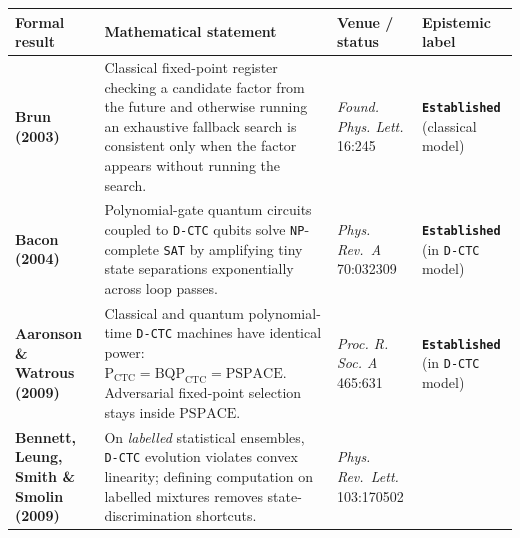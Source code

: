 \documentclass[10pt,letterpaper]{article}
\newcounter{none}
\begin{document}
{\def\LTcaptype{none} %
{\footnotesize\setlength{\tabcolsep}{3.8pt}\renewcommand{\arraystretch}{1.15}
\begin{longtable}[]{@{}
  >{\raggedright\arraybackslash}p{}
  >{\raggedright\arraybackslash}p{}
  >{\raggedright\arraybackslash}p{}
  >{\raggedright\arraybackslash}p{}@{}}
\toprule\noalign{}
\begin{minipage}[b]{\linewidth}\raggedright
\textbf{Formal result}
\end{minipage} & \begin{minipage}[b]{\linewidth}\raggedright
\textbf{Mathematical statement}
\end{minipage} & \begin{minipage}[b]{\linewidth}\raggedright
\textbf{Venue / status}
\end{minipage} & \begin{minipage}[b]{\linewidth}\raggedright
\textbf{Epistemic label}
\end{minipage} \\
\midrule\noalign{}
\endhead
\bottomrule\noalign{}
\endlastfoot
\textbf{Brun (2003)} & Classical fixed-point register checking a
candidate factor from the future and otherwise running an exhaustive
fallback search is consistent only when the factor appears without
running the search. & \emph{Found. Phys. Lett.} 16:245 &
\textbf{\texttt{Established}} (classical model) \\
\textbf{Bacon (2004)} & Polynomial-gate quantum circuits coupled to
\texttt{D-CTC} qubits solve \texttt{NP}-complete \texttt{SAT} by
amplifying tiny state separations exponentially across loop passes. &
\emph{Phys. Rev.~A} 70:032309 & \textbf{\texttt{Established}} (in
\texttt{D-CTC} model) \\
\textbf{Aaronson \& Watrous (2009)} & Classical and quantum
polynomial-time \texttt{D-CTC} machines have identical power:
\(\mathrm{P}_{\text{CTC}} = \mathrm{BQP}_{\text{CTC}} = \mathrm{PSPACE}\).
Adversarial fixed-point selection stays inside \(\mathrm{PSPACE}\). &
\emph{Proc. R. Soc. A} 465:631 & \textbf{\texttt{Established}} (in
\texttt{D-CTC} model) \\
\textbf{Bennett, Leung, Smith \& Smolin (2009)} & On \emph{labelled}
statistical ensembles, \texttt{D-CTC} evolution violates convex
linearity; defining computation on labelled mixtures removes
state-discrimination shortcuts. & \emph{Phys. Rev.~Lett.} 103:170502 &

\end{longtable}}}
\end{document}

